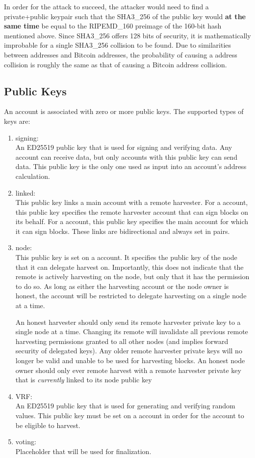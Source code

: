 In order for the attack to succeed, the attacker would need to find a private+public keypair such that the SHA3\_256 of the public key would \textbf{at the same time} be equal to the RIPEMD\_160 preimage of the 160-bit hash mentioned above.
Since SHA3\_256 offers 128 bits of security, it is mathematically improbable for a single SHA3\_256 collision to be found.
Due to similarities between \codenamespace addresses and Bitcoin addresses, the probability of causing a \codenamespace address collision is roughly the same as that of causing a Bitcoin address collision.

\subsection{Public Keys}

An account is associated with zero or more public keys. The supported types of keys are:
\begin{enumerate}
	\item{signing: \\
		An ED25519 public key that is used for signing and verifying data.
		Any account can receive data, but only accounts with this public key can send data.
		This public key is the only one used as input into an account's address calculation.
	}
	\item{linked: \\
		This public key links a main account with a remote harvester.
		For a  account, this public key specifies the remote harvester account that can sign blocks on its behalf.
		For a  account, this public key specifies the main account for which it can sign blocks.
		These links are bidirectional and always set in pairs.
	}
	\item{node: \\
		This public key is set on a  account.
		It specifies the public key of the node that it can delegate harvest on.
		Importantly, this does not indicate that the remote is actively harvesting on the node, but only that it has the permission to do so.
		As long as either the harvesting account or the node owner is honest, the account will be restricted to delegate harvesting on a single node at a time.

		An honest harvester should only send its remote harvester private key to a single node at a time.
		Changing its remote will invalidate all previous remote harvesting permissions granted to all other nodes (and implies forward security of delegated keys).
		Any older remote harvester private keys will no longer be valid and unable to be used for harvesting blocks.
		An honest node owner should only ever remote harvest with a remote harvester private key that is \emph{currently} linked to its node public key
	}
	\item{VRF: \\
		An ED25519 public key that is used for generating and verifying random values.
		This public key must be set on a  account in order for the account to be eligible to harvest.
	}
	\item{voting: \\
		Placeholder that will be used for finalization.
	}
\end{enumerate}
